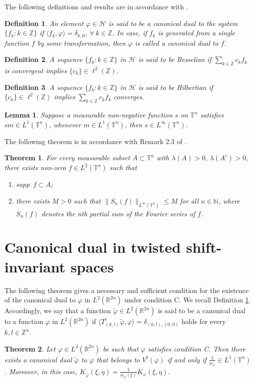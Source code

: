 \documentclass[a4paper,12pt,reqno]{amsart}
\theoremstyle{plain}
\newtheorem{thm}{Theorem}[section]
\numberwithin{equation}{section}
\newtheorem{lem}{Lemma}[section]
\newtheorem{defn}{Definition}[section]
\theoremstyle{definition}
\begin{document}
The following definitions and results are in accordance with \cite{hre}.
\begin{defn}\label{3pdef6}
An element $\varphi\in\mathcal{H}$ is said to be a canonical dual to the system $\{f_{k}:k\in\mathbb{Z}\}$ if $\langle f_{k},\varphi\rangle=\delta_{k,0},~\forall~k\in\mathbb{Z}$. In case, if $f_{k}$ is generated from a single function $f$ by some transformation, then $\varphi$ is called a canonical dual to $f$.
\end{defn}
\begin{defn}
A sequence $\{f_{k}:{k \in\mathbb {Z}}\}$ in $\mathcal{H}$ is said to be Besselian if $\sum\limits_{k\in\mathbb{Z}}c_{k}f_{k}$ is convergent implies $\{c_{k}\}\in\ell^{2}(\mathbb{Z})$.
\end{defn}
\begin{defn}
A sequence $\{f_{k}:{k \in\mathbb {Z}}\}$ in $\mathcal{H}$ is said to be Hilbertian if $\{c_{k}\}\in\ell^{2}(\mathbb{Z})$ implies $\sum\limits_{k\in\mathbb{Z}}c_{k}f_{k}$ converges.
\end{defn}
\begin{lem}\label{3plem1}
Suppose a measurable non-negative function $s$ on $\mathbb{T}^{n}$ satisfies $sm\in L^{1}(\mathbb{T}^{n})$, whenever $m\in L^{1}(\mathbb{T}^{n})$, then $s\in L^{\infty}(\mathbb{T}^{n})$.
\end{lem}
The following theorem is in accordance with Remark 2.3 of \cite{ss}.
\begin{thm}\label{3pth4}
For every measurable subset $A\subset\mathbb{T}^{n}$ with $\lambda{(A)}> 0$, $\lambda{(A^{c})}> 0$, there exists non-zero $f\in L^{2}(\mathbb{T}^{n})$ such that
\begin{enumerate}
\item supp~$f\subset A$;
\item there exists $M> 0$ such that $\|S_{n}(f)\|_{L^{\infty}(\mathbb{T}^{n})}\leq M$ for all $n\in\mathbb{N}$, where $S_{n}(f)$ denotes the nth partial sum of the Fourier series of $f$.
\end{enumerate}
\end{thm}
\section{Canonical dual in twisted shift-invariant spaces}
The following theorem gives a necessary and sufficient condition for the existence of the canonical dual to $\varphi$ in $L^{2}(\mathbb{R}^{2n})$ under condition C. We recall Definition \ref{3pdef6}. Accordingly, we say that a function $\tilde{\varphi}\in L^{2}(\mathbb{R}^{2n})$ is said to be a canonical dual to a function $\varphi$ in $L^{2}(\mathbb{R}^{2n})$ if $\langle T_{(k,l)}^{t}\tilde{\varphi},\varphi\rangle=\delta_{(k,l),(0,0)}$ holds for every $k,l\in\mathbb{Z}^{n}$.
\begin{thm}\label{3pth1}
Let $\varphi\in L^{2}(\mathbb{R}^{2n})$ be such that $\varphi$ satisfies condition C. Then there exists a canonical dual $\tilde{\varphi}$ to $\varphi$ that belongs to $V^{t}(\varphi)$ if and only if $\frac{1}{w_{\varphi}}\in L^{1}(\mathbb{T}^{n})$. Moreover, in this case, $K_{\tilde{\varphi}}(\xi,\eta)=\frac{1}{w_{\varphi}(\xi)} K_{\varphi}(\xi, \eta)$.
\end{thm}
\end{document}
